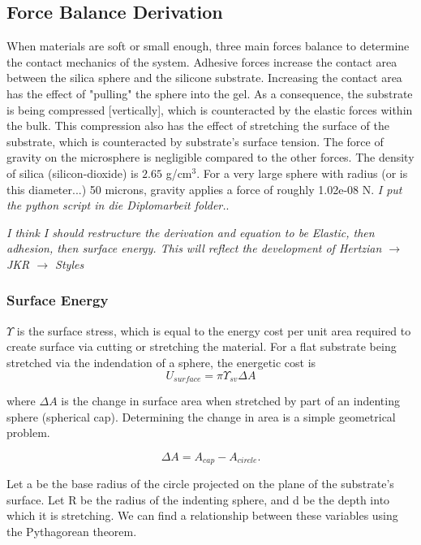 \subsection{Force Balance Derivation}
When materials are soft or small enough, three main forces balance to determine the contact mechanics of the system. Adhesive forces increase the contact area between the silica sphere and the silicone substrate. Increasing the contact area has the effect of "pulling" the sphere into the gel. As a consequence, the substrate is being compressed [vertically], which is counteracted by the elastic forces within the bulk. This compression also has the effect of stretching the surface of the substrate, which is counteracted by substrate's surface tension. The force of gravity on the microsphere is negligible compared to the other forces. The density of silica (silicon-dioxide) is $2.65$ g/cm$^3$. For a very large sphere with radius (or is this diameter...) 50 microns, gravity applies a force of roughly 1.02e-08 N. \emph{I put the python script in die Diplomarbeit folder.}.


\emph{I think I should restructure the derivation and equation to be Elastic, then adhesion, then surface energy. This will reflect the development of Hertzian $ \rightarrow $ JKR $ \rightarrow $ Styles}

\subsubsection{Surface Energy}
$\Upsilon$ is the surface stress, which is equal to the energy cost per unit area required to create surface via cutting or stretching the material. For a flat substrate being stretched via the indendation of a sphere, the energetic cost is
\begin{equation}
\label{generic_surface_energy}
U_{surface} = \pi \Upsilon_{sv}\Delta A
\end{equation}

where $\Delta A$ is the change in surface area when stretched by part of an indenting sphere (spherical cap). Determining the change in area is a simple geometrical problem.

\begin{equation}
\Delta A = A_{cap} - A_{circle}. 
\end{equation}

Let a be the base radius of the circle projected on the plane of the substrate's surface. Let R be the radius of the indenting sphere, and d be the depth into which it is stretching. We can find a relationship between these variables using the Pythagorean theorem.

